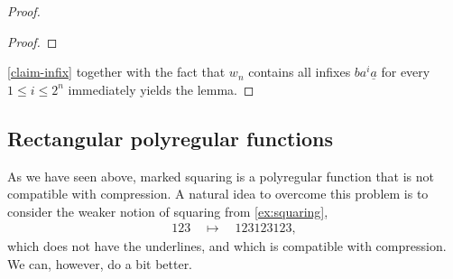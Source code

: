 \documentclass[a4paper,UKenglish,cleveref, autoref, thm-restate]{lipics-v2021}
\begin{document}
\begin{proof}
\begin{proof}
    \end{proof}
\cref{claim-infix} together with the fact that $w_n$ contains all infixes $b a^i \underline{a}$ for every $1 \le i \le 2^n $ immediately yields the lemma. 
\end{proof}

\subsection{Rectangular polyregular functions}

As we have seen above, marked squaring is a polyregular function that is  not compatible with compression. A natural idea to overcome this problem is to consider the weaker notion of squaring from \cref{ex:squaring},
\begin{align*}
123 \quad \mapsto \quad 123123123,
\end{align*}
which does not have the underlines, and which is compatible with compression. We can, however, do a bit better. 
\end{document}
